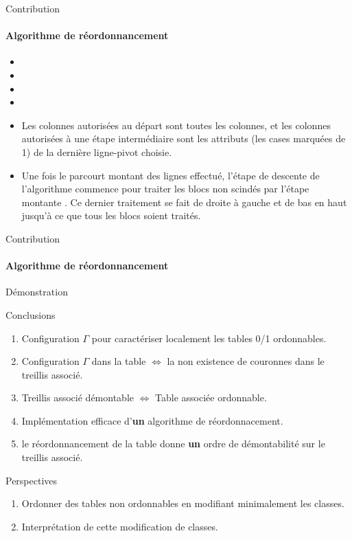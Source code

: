 \documentclass{beamer}
\begin{document}
 \begin{frame}{Contribution}
  \framesubtitle{Algorithme de réordonnancement}
\begin{itemize}

 \item
 \item
 \item 
 \item
 \item Les colonnes autorisées au départ sont toutes les colonnes, et les colonnes autorisées à une étape intermédiaire sont les attributs (les cases marquées de 1) 
de la dernière ligne-pivot choisie.

 \item Une fois le parcourt montant des lignes effectué, l'étape de descente de l'algorithme commence pour traiter les blocs non scindés par l'étape montante 
. Ce dernier traitement se fait de droite à gauche et de bas en haut jusqu'à ce que tous les blocs soient traités.
\end{itemize}

  \end{frame}

 \begin{frame}{Contribution}
  \framesubtitle{Algorithme de réordonnancement}

Démonstration

  \end{frame}
  \begin{frame}{Conclusions}
  \begin{enumerate}
  \item Configuration $\Gamma$ pour caractériser localement les tables 0/1 ordonnables. 
  \item Configuration $\Gamma$ dans la table $\Leftrightarrow$ la non existence de couronnes dans le treillis associé.
  \item Treillis associé démontable $\Leftrightarrow$ Table associée ordonnable.
  \item Implémentation efficace d'\textbf{un} algorithme de réordonnacement.
  \item le réordonnancement de la table donne \textbf{un} ordre de démontabilité sur le treillis associé.
  \end{enumerate}
  \end{frame}
  \begin{frame}{Perspectives}
  \begin{enumerate}
  \item Ordonner des tables non ordonnables en modifiant minimalement les classes.
  \item Interprétation de cette modification de classes.
  \end{enumerate}
  \end{frame}
\end{document}
